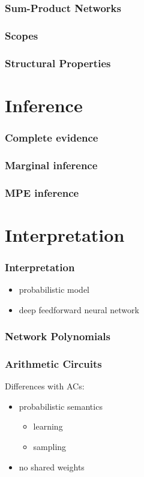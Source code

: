 \documentclass[10pt,t]{beamer}
\begin{document}
\begin{frame}
  \frametitle{Sum-Product Networks}
\end{frame}

\begin{frame}
  \frametitle{Scopes}
\end{frame}

\begin{frame}
  \frametitle{Structural Properties}
\end{frame}

\section{Inference}
{
  \begin{frame}
    \sectionpage
  \end{frame}
}

\begin{frame}
  \frametitle{Complete evidence}
\end{frame}

\begin{frame}
  \frametitle{Marginal inference}
\end{frame}

\begin{frame}
  \frametitle{MPE inference}
\end{frame}


\section{Interpretation}
{
  \begin{frame}
    \sectionpage
  \end{frame}
}

\begin{frame}
\frametitle{Interpretation}
\begin{itemize}
\item probabilistic model
\item deep feedforward neural network
\end{itemize}
\end{frame}


\begin{frame}
\frametitle{Network Polynomials}
\end{frame}

\begin{frame}
  \frametitle{Arithmetic Circuits}
  Differences with ACs:
  \begin{itemize}
  \item probabilistic semantics
    \begin{itemize}
    \item learning
      \item sampling
    \end{itemize}
    \item no shared weights
  \end{itemize}
\end{frame}
\end{document}
